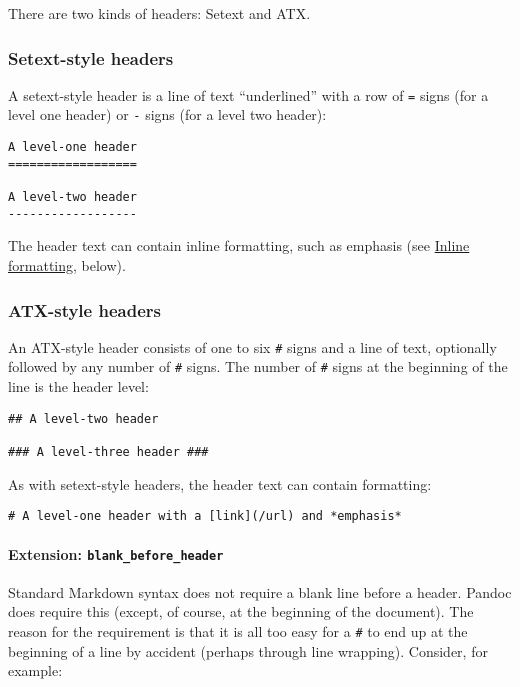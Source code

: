 \documentclass[]{article}
\let\oldparagraph\paragraph
\renewcommand{\paragraph}[1]{\oldparagraph{#1}\mbox{}}
\begin{document}
There are two kinds of headers: Setext and ATX.

\subsubsection{Setext-style headers}\label{setext-style-headers}

A setext-style header is a line of text ``underlined'' with a row of
\texttt{=} signs (for a level one header) or \texttt{-} signs (for a
level two header):

\begin{verbatim}
A level-one header
==================

A level-two header
------------------
\end{verbatim}

The header text can contain inline formatting, such as emphasis (see
\protect\hyperlink{inline-formatting}{Inline formatting}, below).

\subsubsection{ATX-style headers}\label{atx-style-headers}

An ATX-style header consists of one to six \texttt{\#} signs and a line
of text, optionally followed by any number of \texttt{\#} signs. The
number of \texttt{\#} signs at the beginning of the line is the header
level:

\begin{verbatim}
## A level-two header

### A level-three header ###
\end{verbatim}

As with setext-style headers, the header text can contain formatting:

\begin{verbatim}
# A level-one header with a [link](/url) and *emphasis*
\end{verbatim}

\paragraph{\texorpdfstring{Extension:
\texttt{blank\_before\_header}}{Extension: blank\_before\_header}}\label{extension-blank_before_header}

Standard Markdown syntax does not require a blank line before a header.
Pandoc does require this (except, of course, at the beginning of the
document). The reason for the requirement is that it is all too easy for
a \texttt{\#} to end up at the beginning of a line by accident (perhaps
through line wrapping). Consider, for example:
\end{document}
